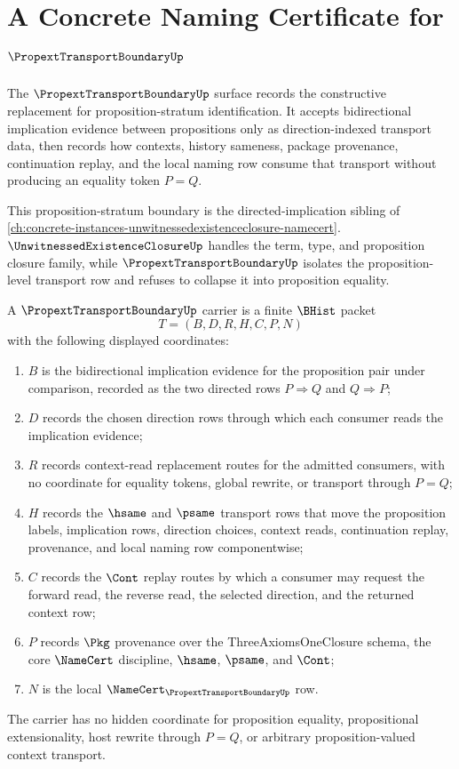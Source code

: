 \chapter{A Concrete Naming Certificate for $\PropextTransportBoundaryUp$}
\label{ch:concrete-instances-propexttransportboundary-namecert}

The $\PropextTransportBoundaryUp$ surface records the constructive replacement for proposition-stratum identification. It accepts bidirectional implication evidence between propositions only as direction-indexed transport data, then records how contexts, history sameness, package provenance, continuation replay, and the local naming row consume that transport without producing an equality token $P=Q$.

This proposition-stratum boundary is the directed-implication sibling of
\autoref{ch:concrete-instances-unwitnessedexistenceclosure-namecert}.
$\UnwitnessedExistenceClosureUp$ handles the term, type, and proposition
closure family, while $\PropextTransportBoundaryUp$ isolates the
proposition-level transport row and refuses to collapse it into proposition
equality.

\begin{definition}
\label{def:propext-transport-boundary-carrier}
A $\PropextTransportBoundaryUp$ carrier is a finite $\BHist$ packet
$$
T=(B,D,R,H,C,P,N)
$$
with the following displayed coordinates:
\begin{enumerate}
\item $B$ is the bidirectional implication evidence for the proposition pair under comparison, recorded as the two directed rows $P\Rightarrow Q$ and $Q\Rightarrow P$;
\item $D$ records the chosen direction rows through which each consumer reads the implication evidence;
\item $R$ records context-read replacement routes for the admitted consumers, with no coordinate for equality tokens, global rewrite, or transport through $P=Q$;
\item $H$ records the $\hsame$ and $\psame$ transport rows that move the proposition labels, implication rows, direction choices, context reads, continuation replay, provenance, and local naming row componentwise;
\item $C$ records the $\Cont$ replay routes by which a consumer may request the forward read, the reverse read, the selected direction, and the returned context row;
\item $P$ records $\Pkg$ provenance over the ThreeAxiomsOneClosure schema, the core $\NameCert$ discipline, $\hsame$, $\psame$, and $\Cont$;
\item $N$ is the local $\NameCert_{\PropextTransportBoundaryUp}$ row.
\end{enumerate}
The carrier has no hidden coordinate for proposition equality, propositional extensionality, host rewrite through $P=Q$, or arbitrary proposition-valued context transport.
\end{definition}

